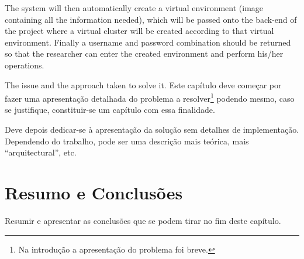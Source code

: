 The system will then automatically create a virtual environment (image containing all the information needed), which will be passed onto the back-end of the project where a virtual cluster will be created according to that virtual environment.
Finally a username and password combination should be returned so that the researcher can enter the created environment and perform his/her operations.

The issue and the approach taken to solve it.
Este capítulo deve começar por fazer uma apresentação detalhada do
problema a resolver\footnote{Na introdução a apresentação do
  problema foi breve.} podendo mesmo, caso se justifique,
constituir-se um capítulo com essa finalidade.

Deve depois dedicar-se à apresentação da solução sem detalhes de
implementação. 
Dependendo do trabalho, pode ser uma descrição mais teórica, mais
``arquitectural'', etc.

\section{Resumo e Conclusões}

Resumir e apresentar as conclusões que se podem tirar no fim deste
capítulo.
